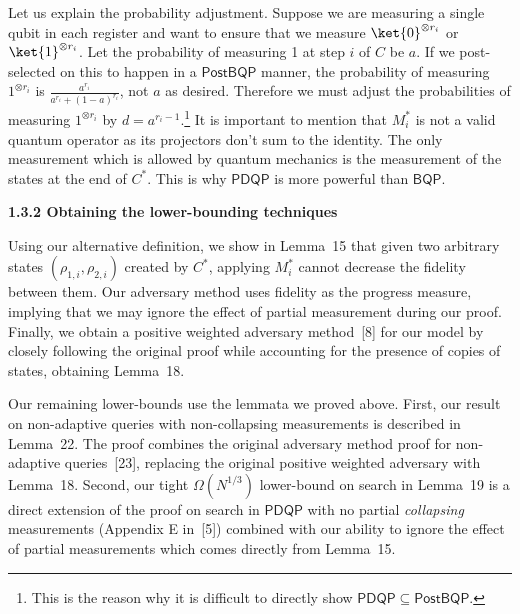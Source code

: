 \documentclass[10pt,a4paper]{article}
\begin{document}
Let us explain the probability adjustment. Suppose we are measuring a single qubit in each register and want to ensure that we measure $\ket{0}^{\otimes r_{i}}$ or $\ket{1}^{\otimes r_{i}}$. Let the probability of measuring 1 at step $i$ of $C$ be $a$. If we post-selected on this to happen in a $\mathsf{PostBQP}$ manner, the probability of measuring $1^{\otimes r_{i}}$ is $\frac{a^{r_{i}}}{a^{r_{i}}+(1-a)^{r_{i}}}$, not $a$ as desired. Therefore we must adjust the probabilities of measuring $1^{\otimes r_{i}}$ by $d=a^{r_{i}-1}$.\footnote{This is the reason why it is difficult to directly show $\mathsf{PDQP}\subseteq\mathsf{PostBQP}$.} It is important to mention that $M^{*}_{i}$ is not a valid quantum operator as its projectors don’t sum to the identity. The only measurement which is allowed by quantum mechanics is the measurement of the states at the end of $C^{*}$. This is why $\mathsf{PDQP}$ is more powerful than $\mathsf{BQP}$.\par





\par\medskip\noindent\textbf{
1.3.2 Obtaining the lower-bounding techniques}\par




Using our alternative definition, we show in Lemma 15 that given two arbitrary states $(\rho_{1,i},\rho_{2,i})$ created by $C^{*}$, applying $M^{*}_{i}$ cannot decrease the fidelity between them. Our adversary method uses fidelity as the progress measure, implying that we may ignore the effect of partial measurement during our proof. Finally, we obtain a positive weighted adversary method [8] for our model by closely following the original proof while accounting for the presence of copies of states, obtaining Lemma 18.\par




Our remaining lower-bounds use the lemmata we proved above. First, our result on non-adaptive queries with non-collapsing measurements is described in Lemma 22. The proof combines the original adversary method proof for non-adaptive queries [23], replacing the original positive weighted adversary with Lemma 18. Second, our tight $\Omega(N^{1/3})$ lower-bound on search in Lemma 19 is a direct extension of the proof on search in $\mathsf{PDQP}$ with no partial \emph{collapsing} measurements (Appendix E in [5]) combined with our ability to ignore the effect of partial measurements which comes directly from Lemma 15.\par
\end{document}
